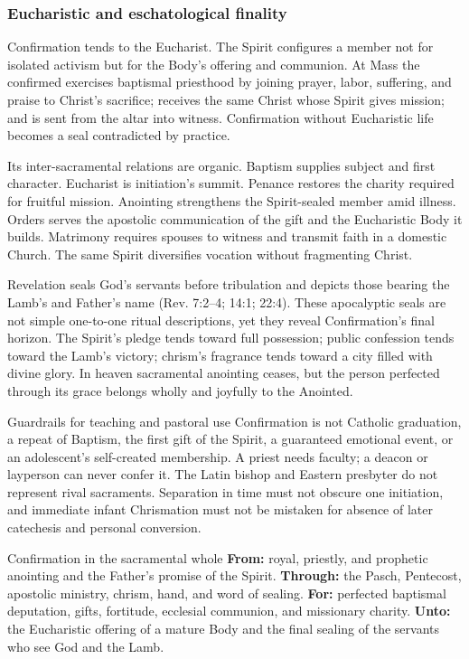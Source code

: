 \subsubsection{Eucharistic and eschatological finality}

Confirmation tends to the Eucharist. The Spirit configures a member not for isolated activism but for the Body's offering and communion. At Mass the confirmed exercises baptismal priesthood by joining prayer, labor, suffering, and praise to Christ's sacrifice; receives the same Christ whose Spirit gives mission; and is sent from the altar into witness. Confirmation without Eucharistic life becomes a seal contradicted by practice.

Its inter-sacramental relations are organic. Baptism supplies subject and first character. Eucharist is initiation's summit. Penance restores the charity required for fruitful mission. Anointing strengthens the Spirit-sealed member amid illness. Orders serves the apostolic communication of the gift and the Eucharistic Body it builds. Matrimony requires spouses to witness and transmit faith in a domestic Church. The same Spirit diversifies vocation without fragmenting Christ.

Revelation seals God's servants before tribulation and depicts those bearing the Lamb's and Father's name (Rev. 7:2--4; 14:1; 22:4). These apocalyptic seals are not simple one-to-one ritual descriptions, yet they reveal Confirmation's final horizon. The Spirit's pledge tends toward full possession; public confession tends toward the Lamb's victory; chrism's fragrance tends toward a city filled with divine glory. In heaven sacramental anointing ceases, but the person perfected through its grace belongs wholly and joyfully to the Anointed.

\begin{studybox}{Guardrails for teaching and pastoral use}
Confirmation is not Catholic graduation, a repeat of Baptism, the first gift of the Spirit, a guaranteed emotional event, or an adolescent's self-created membership. A priest needs faculty; a deacon or layperson can never confer it. The Latin bishop and Eastern presbyter do not represent rival sacraments. Separation in time must not obscure one initiation, and immediate infant Chrismation must not be mistaken for absence of later catechesis and personal conversion.
\end{studybox}

\begin{massbox}{Confirmation in the sacramental whole}
\textbf{From:} royal, priestly, and prophetic anointing and the Father's promise of the Spirit. \textbf{Through:} the Pasch, Pentecost, apostolic ministry, chrism, hand, and word of sealing. \textbf{For:} perfected baptismal deputation, gifts, fortitude, ecclesial communion, and missionary charity. \textbf{Unto:} the Eucharistic offering of a mature Body and the final sealing of the servants who see God and the Lamb.
\end{massbox}
